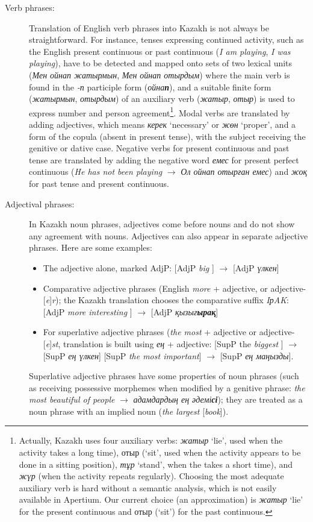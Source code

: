 \documentclass[11pt]{article}
\begin{document}
\begin{description}
\begin{itemize}
    \end{itemize}
\item[Verb phrases:] Translation of English verb phrases into Kazakh is not always be straightforward. For instance,
tenses expressing continued activity, such as the 
  English present continuous or past continuous (\emph{I am playing}, \emph{I was playing}), have to be detected and 
  mapped onto sets of two lexical units (\emph{Мен ойнап жатырмын}, \emph{Мен ойнап отырдым}) where the main verb is 
  found in the \emph{-п} participle form (\emph{ойна\textbf{п}}), and a suitable finite form  (\emph{жатырмын}, \emph{отырдым}) of an auxiliary 
  verb (\emph{жатыр}, \emph{отыр}) is used to express number and person agreement\footnote{Actually, Kazakh uses four auxiliary verbs: \emph{жатыр} `lie', 
      used when the activity takes a long time), отыр (`sit', used when the activity appears to be done in a sitting position), \emph{тұр} `stand', 
      when the takes a short time), and \emph{жүр} (when the activity repeats regularly). Choosing the most adequate auxiliary verb is 
      hard without a semantic analysis, which is not easily available in Apertium. Our current choice (an approximation) 
      is \emph{жатыр} `lie' for the present continuous and отыр (`sit') for the past continuous.}. Modal verbs are translated by adding adjectives, which means \emph{керек} `necessary' or \emph{жөн} `proper', 
  and a form of the copula (absent in present tense), with the subject receiving the genitive or dative case. Negative 
  verbs for present continuous and past tense are translated by adding the negative word \emph{емес} for present 
  perfect continuous (\emph{He has not been playing} \(\to\) \emph{Ол ойнап отырған емес}) and  \emph{жоқ} for past tense and 
  present continuous.
\item[Adjectival phrases:] In Kazakh noun phrases, adjectives come before nouns and do not show any agreement 
  with nouns.  Adjectives can also appear in separate adjective phrases. Here are some examples:
\begin{itemize}
\item The adjective alone, marked AdjP: [AdjP \emph{big} ] $\rightarrow$ [AdjP \emph{үлкен}] 
\item Comparative adjective phrases  (English \emph{more} + adjective, or adjective-[\emph{e}]\emph{r}); the Kazakh translation 
   chooses the comparative suffix \emph{{I}р{A}{K}}: [AdjP  \emph{more  interesting} ]  $\rightarrow$ [AdjP \emph{қызығ\textbf{ырақ}}]
\item For superlative adjective phrases  (\emph{the most} + adjective  or adjective-[\emph{e}]\emph{st}, translation 
   is built using \emph{ең} + adjective:  [SupP  the \emph{biggest} ]  $\rightarrow$ [SupP \emph{ең үлкен}] 
   [SupP  \emph{the most important}]   $\rightarrow$ [SupP \emph{ең маңызды}].
\end{itemize}
Superlative adjective phrases have some properties of noun phrases (such as receiving possessive morphemes when 
modified by a genitive phrase: \emph{the most beautiful of people} $\rightarrow$ \emph{адамдардың ең әдемі\textbf{сі}}); they are treated as a noun phrase with an implied noun (\emph{the largest} [\emph{book}]).


\end{description}
\end{document}
